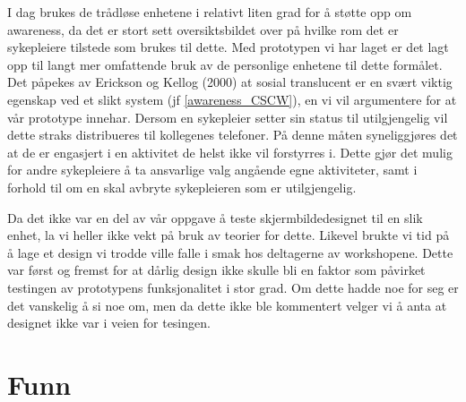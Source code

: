\noindent
I dag brukes de trådløse enhetene i relativt liten grad for å støtte opp om awareness, da det er stort sett oversiktsbildet over på hvilke rom det er sykepleiere tilstede som brukes til dette. Med prototypen vi har laget er det lagt opp til langt mer omfattende bruk av de personlige enhetene til dette formålet. Det påpekes av Erickson og Kellog (2000) at sosial translucent er en svært viktig egenskap ved et slikt system (jf \ref{awareness_CSCW}), en vi vil argumentere for at vår prototype innehar.  Dersom en sykepleier setter sin status til utilgjengelig vil dette straks distribueres til kollegenes telefoner. På denne måten syneliggjøres det at de er engasjert i en aktivitet de helst ikke vil forstyrres i. Dette gjør det mulig for andre sykepleiere å ta ansvarlige valg angående egne aktiviteter, samt i forhold til om en skal avbryte sykepleieren som er utilgjengelig. 

\noindent
Da det ikke var en del av vår oppgave å teste skjermbildedesignet til en slik enhet, la vi heller ikke vekt på bruk av teorier for dette. Likevel brukte vi tid på å lage et design vi trodde ville falle i smak hos deltagerne av workshopene. Dette var først og fremst for at dårlig design ikke skulle bli en faktor som påvirket testingen av prototypens funksjonalitet i stor grad. Om dette hadde noe for seg er det vanskelig å si noe om, men da dette ikke ble kommentert velger vi å anta at designet ikke var i veien for tesingen.

\section{Funn}

